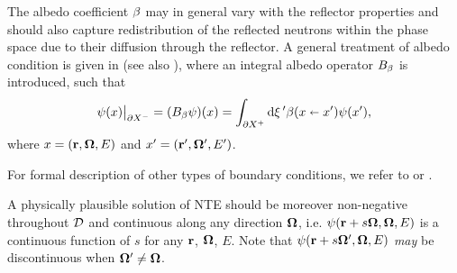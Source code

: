 \begin{remark}
	The albedo coefficient $\albedo$ may in general vary with the reflector properties and should also capture 
	redistribution of the reflected neutrons within the phase space due to their diffusion through the reflector. A general
	treatment of albedo condition is given in \cite{Sanchez4} (see also \cite{Sanchez3}), where an integral albedo operator
	$\albedoop$ is introduced, such that
\begin{equation}\label{eq:albedo-general}
	\angflux(x)\big\vert_{\pX[-]} = (\albedoop\angflux)(x) = \bndint[']{\pX[+]}\albedo(x\sla x')\angflux(x'),
\end{equation}
	where $x = (\br,\bomega,E)$ and $x' = (\br',\bomega',E')$. 
\end{remark}
For formal description of other types of boundary conditions, we refer to \cite{Sanchez4} or \cite[Sec. 1.3]{Agoshkov}.

A physically plausible solution of NTE should be moreover non-negative throughout $\VV$ and continuous along any
direction $\bomega$, i.e. $\psi(\br + s\bomega,\bomega,E)$ is a continuous function of $s$ for any $\br$, $\bomega$, $E$. Note
that $\psi(\br + s\bomega',\bomega,E)$ \textsl{may} be discontinuous when $\bomega' \neq \bomega$.

